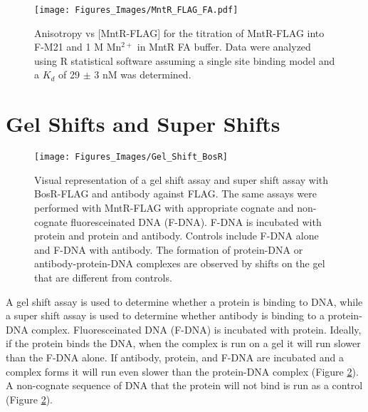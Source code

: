 \documentclass[12pt,twoside]{reedthesis}
\begin{document}
       	\begin{figure}[h!tbp]
       		\centering
       		\texttt{[image: Figures\_Images/MntR\_FLAG\_FA.pdf]}
       		\caption[Determining Activity of MntR-FLAG by Fluorescence Anistropy]{Anisotropy vs [MntR-FLAG]  for the titration of MntR-FLAG into F-M21 and 1 \micro M Mn$^{2+}$ in MntR FA buffer. Data were analyzed using R statistical software assuming a single site binding model and a $K_{d}$ of 29 $\pm$ 3 nM was determined.}
       		\label{MntRFLAGFA}
       	\end{figure}
      
      \clearpage
      
\section{Gel Shifts and Super Shifts}


  		\begin{figure}[h!tbp]
  		
  			\centering
  			\texttt{[image: Figures\_Images/Gel\_Shift\_BosR]}
  			\caption[Gel Shift and Super Shift]{Visual representation of a gel shift assay and super shift assay with BosR-FLAG and antibody against FLAG. The same assays were performed with MntR-FLAG with appropriate cognate and non-cognate fluoresceinated DNA (F-DNA). F-DNA is incubated with protein and protein and antibody. Controls include F-DNA alone and F-DNA with antibody. The formation of protein-DNA or antibody-protein-DNA complexes are observed by shifts on the gel that are different from controls.}
  			\label{GelShift_Scheme}
  		\end{figure}
  		
A gel shift assay is used to determine whether a protein is binding to DNA, while a super shift assay is used to determine whether antibody is binding to a protein-DNA complex. Fluoresceinated DNA (F-DNA) is incubated with protein. Ideally, if the protein binds the DNA, when the complex is run on a gel it will run slower than the F-DNA alone. If antibody, protein, and F-DNA are incubated and a complex forms it will run even slower than the protein-DNA complex (Figure \ref{GelShift_Scheme}). A non-cognate sequence of DNA that the protein will not bind is run as a control (Figure \ref{GelShift_Scheme}).  
\end{document}
